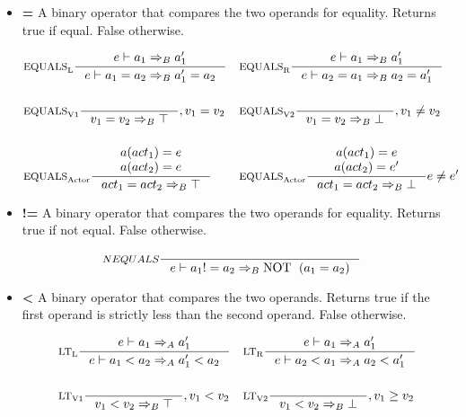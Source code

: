 \begin{itemize}
\item \textbf{=} A binary operator that compares the two operands for equality. Returns true if equal. False otherwise.

\begin{align*}
&\inference[$\text{EQUALS}_\text{L}$]{e \vdash a_1 \Rightarrow_B a_1'}
                    {e \vdash a_1 = a_2 \Rightarrow_B a_1' = a_2}
&
&\inference[$\text{EQUALS}_\text{R}$]{e \vdash a_1 \Rightarrow_B a_1'}
                    {e \vdash a_2 = a_1 \Rightarrow_B a_2 = a_1'}
\\\\
&\inference[$\text{EQUALS}_\text{V1}$]{}
                    {v_1 = v_2 \Rightarrow_B \top}
                    {, v_1 = v_2}
&
&\inference[$\text{EQUALS}_\text{V2}$]{}
                    {v_1 = v_2 \Rightarrow_B \bot}
                    {, v_1 \neq v_2}
\\\\
&\inference[$\text{EQUALS}_\text{Actor}$]{a(act_1) = e\\ a(act_2) = e}
                    {act_1 = act_2 \Rightarrow_B \top}
&
&\inference[$\text{EQUALS}_\text{Actor}$]{a(act_1) = e\\ a(act_2) = e'}
                    {act_1 = act_2 \Rightarrow_B \bot}
                    {e \neq e'}
\end{align*}

\item \textbf{!=} A binary operator that compares the two operands for equality. Returns true if not equal. False otherwise.

\begin{align*}
&\inference[$NEQUALS$]{}
                    {e \vdash a_1 != a_2 \Rightarrow_B \Tnot (a_1 = a_2)}
\end{align*}

\item \textbf{<} A binary operator that compares the two operands. Returns true if the first operand is strictly less than the second operand. False otherwise.

\begin{align*}
&\inference[$\text{LT}_\text{L}$]{e \vdash a_1 \Rightarrow_A a_1'}
                    {e \vdash a_1 < a_2 \Rightarrow_A a_1' < a_2}
&
&\inference[$\text{LT}_\text{R}$]{e \vdash a_1 \Rightarrow_A a_1'}
                    {e \vdash a_2 < a_1 \Rightarrow_A a_2 < a_1'}
\\\\
&\inference[$\text{LT}_\text{V1}$]{}
                    {v_1 < v_2 \Rightarrow_B \top}
                    {, v_1 < v_2}
&
&\inference[$\text{LT}_\text{V2}$]{}
                    {v_1 < v_2 \Rightarrow_B \bot}
                    {, v_1 \geq v_2}
\end{align*}


\end{itemize}
